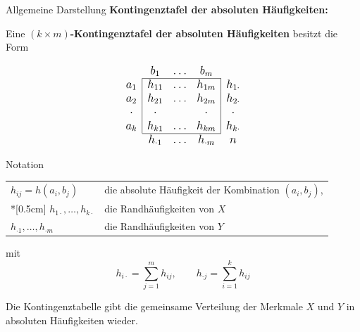\documentclass[
  10pt,
  ignorenonframetext,
]{beamer}
\begin{document}
\begin{frame}{Allgemeine Darstellung}
\label{allgemeine-darstellung}
\textbf{Kontingenztafel der absoluten Häufigkeiten:}

Eine \textbf{\((k \times m)\)-Kontingenztafel der absoluten
Häufigkeiten} besitzt die Form

\begin{displaymath}
\begin{large}
\begin{array}{c|ccc|c}
      \multicolumn{1}{c}{}
        & \multicolumn{1}{c}{b_1}
          & \dots
            & \multicolumn{1}{c}{b_m}\\\cline{2-4}
      a_1 & h_{11} & \dots & h_{1m} & h_{1\cdot}\\
      a_2 & h_{21} & \dots & h_{2m} & h_{2\cdot}\\
       \cdot & \cdot & & \cdot & \cdot \\
      a_k & h_{k1} & \dots & h_{km} & h_{k\cdot}\\\cline{2-4}
      \multicolumn{1}{c}{}
          & \multicolumn{1}{c}{h_{\cdot 1} }
            & \dots
              & \multicolumn{1}{c}{h_{\cdot m} }
                & \multicolumn{1}{c}{n}
\end{array}
\end{large}
\end{displaymath}
\end{frame}

\begin{frame}{Notation}
\label{notation}
\begin{center}
  \begin{tabular}{ll}
  $h_{ij} = h(a_i,b_j)$           & die absolute Häufigkeit der Kombination $(a_i,b_j)$,\\*[0.5cm]
  $h_{1\cdot},\dots,h_{k\cdot}$   & die Randhäufigkeiten von $X$ \\
  $h_{\cdot 1},\dots,h_{\cdot m}$ & die Randhäufigkeiten von $Y$ \\
  \end{tabular}
\end{center}

mit
\[h_{i\cdot} = \sum^m_{j=1} h_{ij},\qquad h_{\cdot j} = \sum^k_{i=1} h_{ij}\]

Die Kontingenztabelle gibt die gemeinsame Verteilung der Merkmale \(X\)
und \(Y\) in absoluten Häufigkeiten wieder.
\end{frame}
\end{document}
